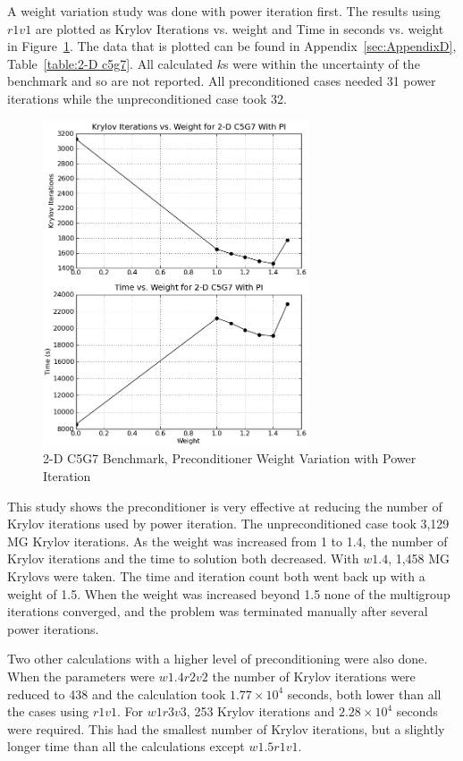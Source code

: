 A weight variation study was done with power iteration first. The results using $r1v1$ are plotted as Krylov Iterations vs. weight and Time in seconds vs. weight in Figure~\ref{fig:2-Dc5g7PI}. The data that is plotted can be found in Appendix~\ref{sec:AppendixD}, Table~\ref{table:2-D c5g7}. All calculated $k$s were within the uncertainty of the benchmark and so are not reported. All preconditioned cases needed 31 power iterations while the unpreconditioned case took 32.
%
\begin{figure}[!ht]
    \begin{center}
      \includegraphics [width=0.7\textwidth, height=0.7\textheight] {2dc5g7PI}
   \end{center}
   \caption{2-D C5G7 Benchmark, Preconditioner Weight Variation with Power Iteration}
   \label{fig:2-Dc5g7PI}
\end{figure}

This study shows the preconditioner is very effective at reducing the number of Krylov iterations used by power iteration. The unpreconditioned case took 3,129 MG Krylov iterations. As the weight was increased from 1 to 1.4, the number of Krylov iterations and the time to solution both decreased. With $w1.4$, 1,458 MG Krylovs were taken. The time and iteration count both went back up with a weight of 1.5. When the weight was increased beyond 1.5 none of the multigroup iterations converged, and the problem was terminated manually after several power iterations. 

Two other calculations with a higher level of preconditioning were also done. When the parameters were $w1.4r2v2$ the number of Krylov iterations were reduced to 438 and the calculation took $1.77 \times 10^{4}$ seconds, both lower than all the cases using $r1v1$. For $w1r3v3$, 253 Krylov iterations and $2.28 \times 10^{4}$ seconds were required. This had the smallest number of Krylov iterations, but a slightly longer time than all the calculations except $w1.5r1v1$.	


